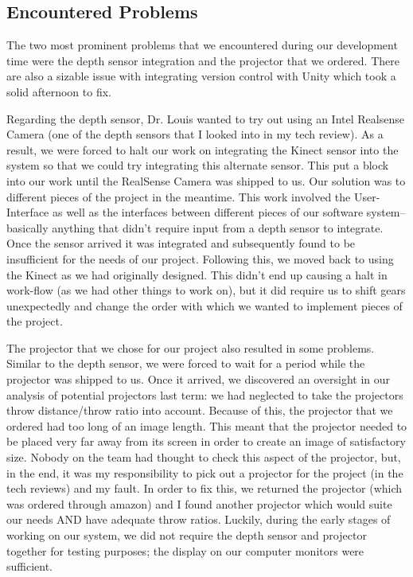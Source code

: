 \documentclass[onecolumn, draftclsnofoot,10pt, compsoc]{IEEEtran}
\begin{document}
\subsection{Encountered Problems} 
The two most prominent problems that we encountered during our development time were the depth sensor integration and the projector that we ordered.  There are also a sizable issue with integrating version control with Unity which took a solid afternoon to fix.

Regarding the depth sensor, Dr. Louis wanted to try out using an Intel Realsense Camera (one of the depth sensors that I looked into in my tech review).  As a result, we were forced to halt our work on integrating the Kinect sensor into the system so that we could try integrating this alternate sensor.  This put a block into our work until the RealSense Camera was shipped to us.  Our solution was to different pieces of the project in the meantime.  This work involved the User-Interface as well as the interfaces between different pieces of our software system-- basically anything that didn't require input from a depth sensor to integrate.  Once the sensor arrived it was integrated and subsequently found to be insufficient for the needs of our project.  Following this, we moved back to using the Kinect as we had originally designed.  This didn't end up causing a halt in work-flow (as we had other things to work on), but it did require us to shift gears unexpectedly and change the order with which we wanted to implement pieces of the project.

The projector that we chose for our project also resulted in some problems.  Similar to the depth sensor, we were forced to wait for a period while the projector was shipped to us.  Once it arrived, we discovered an oversight in our analysis of potential projectors last term: we had neglected to take the projectors throw distance/throw ratio into account.  Because of this, the projector that we ordered had too long of an image length.  This meant that the projector needed to be placed very far away from its screen in order to create an image of satisfactory size.  Nobody on the team had thought to check this aspect of the projector, but, in the end, it was my responsibility to pick out a projector for the project (in the tech reviews) and my fault.  In order to fix this, we returned the projector (which was ordered through amazon) and I found another projector which would suite our needs AND have adequate throw ratios.  Luckily, during the early stages of working on our system, we did not require the depth sensor and projector together for testing purposes; the display on our computer monitors were sufficient.
\end{document}
